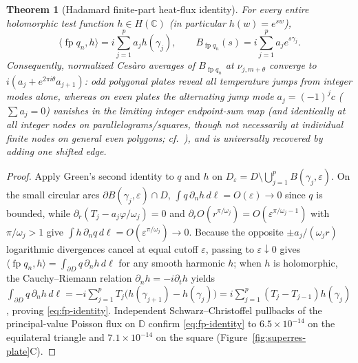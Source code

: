 \documentclass[11pt,reqno]{amsart}
\newtheorem{theorem}{Theorem}[section]
\theoremstyle{definition}
\theoremstyle{remark}
\newcommand{\C}{\mathbb{C}}
\DeclareMathOperator{\fp}{fp}
\begin{document}
\begin{theorem}[Hadamard finite-part heat-flux identity]\label{thm:plate}
For every entire holomorphic test function $h \in H(\C)$ (in particular $h(w) = e^{sw}$),
\begin{equation}\label{eq:fp-identity}
  \langle \fp q_n, h \rangle = i \sum_{j=1}^p a_j h(\gamma_j), \qquad
  B_{\fp q_n}(s) = i \sum_{j=1}^p a_j e^{s\gamma_j}.
\end{equation}
Consequently, normalized Ces\`aro averages of $B_{\fp q_n}$ at $\nu_{j,m+\theta}$ converge to $i(a_j + e^{2\pi i\theta}a_{j+1})$: odd polygonal plates reveal all temperature jumps from integer modes alone, whereas on even plates the alternating jump mode $a_j = (-1)^j c$ ($\sum a_j = 0$) vanishes in the limiting integer endpoint-sum map (and identically at all integer nodes on parallelograms/squares, though not necessarily at individual finite nodes on general even polygons; cf.\ \cite[Remark~4.2]{Paper1}), and is universally recovered by adding one shifted edge.
\end{theorem}

\begin{proof}
Apply Green's second identity to $q$ and $h$ on $D_\varepsilon = D \setminus \bigcup_{j=1}^p B(\gamma_j,\varepsilon)$. On the small circular arcs $\partial B(\gamma_j,\varepsilon) \cap D$, $\int q\,\partial_n h\,d\ell = O(\varepsilon) \to 0$ since $q$ is bounded, while $\partial_r(T_j - a_j\varphi/\omega_j) = 0$ and $\partial_r O(r^{\pi/\omega_j}) = O(\varepsilon^{\pi/\omega_j - 1})$ with $\pi/\omega_j > 1$ give $\int h\,\partial_n q\,d\ell = O(\varepsilon^{\pi/\omega_j}) \to 0$. Because the opposite $\pm a_j/(\omega_j r)$ logarithmic divergences cancel at equal cutoff $\varepsilon$, passing to $\varepsilon \downarrow 0$ gives $\langle \fp q_n, h \rangle = \int_{\partial D} q\,\partial_n h\,d\ell$ for any smooth harmonic $h$; when $h$ is holomorphic, the Cauchy--Riemann relation $\partial_n h = -i\partial_t h$ yields $\int_{\partial D} q\,\partial_n h\,d\ell = -i \sum_{j=1}^p T_j \bigl(h(\gamma_{j+1}) - h(\gamma_j)\bigr) = i \sum_{j=1}^p (T_j - T_{j-1}) h(\gamma_j)$, proving \eqref{eq:fp-identity}. Independent Schwarz--Christoffel pullbacks of the principal-value Poisson flux on $\mathbb{D}$ confirm \eqref{eq:fp-identity} to $6.5\times 10^{-14}$ on the equilateral triangle and $7.1\times 10^{-14}$ on the square (Figure~\ref{fig:superres-plate}C).
\end{proof}
\end{document}
